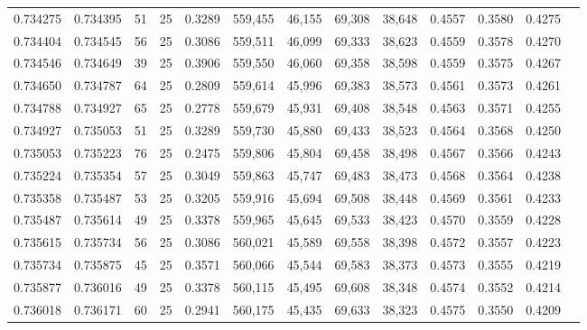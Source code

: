 \begin{tabular}{rrrrrrrrrrrrr}
0.734275 & 0.734395 &    51 &  25 &                                     0.3289 & 559,455 &  46,155 &  69,308 &  38,648 & 0.4557 & 0.3580 & 0.4275 \\
0.734404 & 0.734545 &    56 &  25 &                                     0.3086 & 559,511 &  46,099 &  69,333 &  38,623 & 0.4559 & 0.3578 & 0.4270 \\
0.734546 & 0.734649 &    39 &  25 &                                     0.3906 & 559,550 &  46,060 &  69,358 &  38,598 & 0.4559 & 0.3575 & 0.4267 \\
0.734650 & 0.734787 &    64 &  25 &                                     0.2809 & 559,614 &  45,996 &  69,383 &  38,573 & 0.4561 & 0.3573 & 0.4261 \\
0.734788 & 0.734927 &    65 &  25 &                                     0.2778 & 559,679 &  45,931 &  69,408 &  38,548 & 0.4563 & 0.3571 & 0.4255 \\
0.734927 & 0.735053 &    51 &  25 &                                     0.3289 & 559,730 &  45,880 &  69,433 &  38,523 & 0.4564 & 0.3568 & 0.4250 \\
0.735053 & 0.735223 &    76 &  25 &                                     0.2475 & 559,806 &  45,804 &  69,458 &  38,498 & 0.4567 & 0.3566 & 0.4243 \\
0.735224 & 0.735354 &    57 &  25 &                                     0.3049 & 559,863 &  45,747 &  69,483 &  38,473 & 0.4568 & 0.3564 & 0.4238 \\
0.735358 & 0.735487 &    53 &  25 &                                     0.3205 & 559,916 &  45,694 &  69,508 &  38,448 & 0.4569 & 0.3561 & 0.4233 \\
0.735487 & 0.735614 &    49 &  25 &                                     0.3378 & 559,965 &  45,645 &  69,533 &  38,423 & 0.4570 & 0.3559 & 0.4228 \\
0.735615 & 0.735734 &    56 &  25 &                                     0.3086 & 560,021 &  45,589 &  69,558 &  38,398 & 0.4572 & 0.3557 & 0.4223 \\
0.735734 & 0.735875 &    45 &  25 &                                     0.3571 & 560,066 &  45,544 &  69,583 &  38,373 & 0.4573 & 0.3555 & 0.4219 \\
0.735877 & 0.736016 &    49 &  25 &                                     0.3378 & 560,115 &  45,495 &  69,608 &  38,348 & 0.4574 & 0.3552 & 0.4214 \\
0.736018 & 0.736171 &    60 &  25 &                                     0.2941 & 560,175 &  45,435 &  69,633 &  38,323 & 0.4575 & 0.3550 & 0.4209 \\

\end{tabular}
